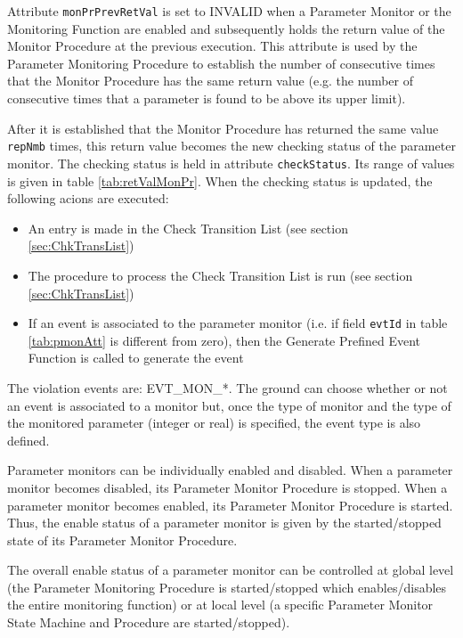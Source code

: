 \documentclass{pnp_article}
\begin{document}
Attribute \texttt{monPrPrevRetVal} is set to INVALID when a Parameter Monitor or the Monitoring Function are enabled and subsequently holds the return value of the Monitor Procedure at the previous execution. This attribute is used by the Parameter Monitoring Procedure to establish the number of consecutive times that the Monitor Procedure has the same return value (e.g. the number of consecutive times that a parameter is found to be above its upper limit).

After it is established that the Monitor Procedure has returned the same value \texttt{repNmb} times, this return value becomes the new checking status of the parameter monitor. The checking status is held in attribute \texttt{checkStatus}. Its range of values is given in table \ref{tab:retValMonPr}. When the checking status is updated, the following acions are executed:

\begin{itemize}
\item An entry is made in the Check Transition List (see section \ref{sec:ChkTransList})
\item The procedure to process the Check Transition List is run (see section \ref{sec:ChkTransList})
\item If an event is associated to the parameter monitor (i.e. if field \texttt{evtId} in table \ref{tab:pmonAtt} is different from zero), then the Generate Prefined Event Function is called to generate the event
\end{itemize}

The violation events are: EVT\_MON\_*. The ground can choose whether or not an event is associated to a monitor but, once the type of monitor and the type of the monitored parameter (integer or real) is specified, the event type is also defined.

Parameter monitors can be individually enabled and disabled. When a parameter monitor becomes disabled, its Parameter Monitor Procedure is stopped. When a parameter monitor becomes enabled, its Parameter Monitor Procedure is started. Thus, the enable status of a parameter monitor is given by the started/stopped state of its Parameter Monitor Procedure.

The overall enable status of a parameter monitor can be controlled at global level (the Parameter Monitoring Procedure is started/stopped which enables/disables the entire monitoring function) or at local level (a specific Parameter Monitor State Machine and Procedure are started/stopped).
\end{document}
